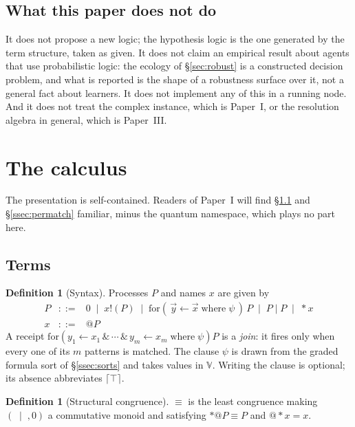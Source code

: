 \documentclass[11pt,a4paper]{article}
\theoremstyle{plain}
\theoremstyle{definition}
\newtheorem{definition}[theorem]{Definition}
\theoremstyle{remark}
\newcommand{\V}{\mathbb{V}}
\newcommand{\scong}{\equiv}
\newcommand{\crisp}[1]{\lceil #1 \rceil}
\begin{document}
\subsection{What this paper does not do}

It does not propose a new logic; the hypothesis logic is the one generated by the
term structure, taken as given. It does not claim an empirical result about
agents that use probabilistic logic: the ecology of \S\ref{sec:robust} is a
constructed decision problem, and what is reported is the shape of a robustness
surface over it, not a general fact about learners. It does not implement any of
this in a running node. And it does not treat the complex instance, which is
Paper~I, or the resolution algebra in general, which is Paper~III.

\section{The calculus}\label{sec:calculus}

The presentation is self-contained. Readers of Paper~I will find
\S\ref{ssec:syntax} and \S\ref{ssec:permatch} familiar, minus the quantum
namespace, which plays no part here.

\subsection{Terms}\label{ssec:syntax}

\begin{definition}[Syntax]\label{def:syntax}
Processes $P$ and names $x$ are given by
\[
\begin{array}{rcl}
P &::=& 0 \;\mid\; x!(P) \;\mid\; \text{for}(\,\vec{y} \leftarrow \vec{x}
  \;\text{where}\; \psi\,)\,P \;\mid\; P \mid P \;\mid\; *x \\[2pt]
x &::=& @P
\end{array}
\]
A receipt $\text{for}(y_1 \leftarrow x_1 \,\&\, \cdots \,\&\, y_m \leftarrow x_m
\;\text{where}\; \psi)P$ is a \emph{join}: it fires only when every one of its
$m$ patterns is matched. The clause $\psi$ is drawn from the graded formula sort
of \S\ref{ssec:sorts} and takes values in $\V$. Writing the clause is optional;
its absence abbreviates $\crisp{\top}$.
\end{definition}

\begin{definition}[Structural congruence]\label{def:cong}
$\scong$ is the least congruence making $(\;\mid\;, 0)$ a commutative monoid and
satisfying $*@P \scong P$ and $@*x = x$.
\end{definition}
\end{document}
